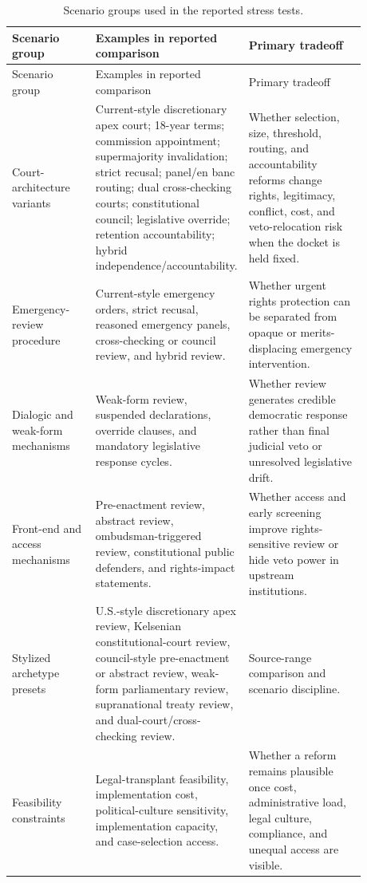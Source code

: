 \documentclass[
  journal=small,
  manuscript=research-article,
  year=2026
]{cup-journal}
\begin{document}
\begin{longtable}{L{0.24\linewidth}L{0.30\linewidth}L{0.34\linewidth}}
\caption{Scenario groups used in the reported stress tests.}
\label{tab:design-space}\\
\toprule
Scenario group & Examples in reported comparison & Primary tradeoff \\
\midrule
\endfirsthead
\toprule
Scenario group & Examples in reported comparison & Primary tradeoff \\
\midrule
\endhead
Court-architecture variants & Current-style discretionary apex court; 18-year terms; commission appointment; supermajority invalidation; strict recusal; panel/en banc routing; dual cross-checking courts; constitutional council; legislative override; retention accountability; hybrid independence/accountability. & Whether selection, size, threshold, routing, and accountability reforms change rights, legitimacy, conflict, cost, and veto-relocation risk when the docket is held fixed. \\
Emergency-review procedure & Current-style emergency orders, strict recusal, reasoned emergency panels, cross-checking or council review, and hybrid review. & Whether urgent rights protection can be separated from opaque or merits-displacing emergency intervention. \\
Dialogic and weak-form mechanisms & Weak-form review, suspended declarations, override clauses, and mandatory legislative response cycles. & Whether review generates credible democratic response rather than final judicial veto or unresolved legislative drift. \\
Front-end and access mechanisms & Pre-enactment review, abstract review, ombudsman-triggered review, constitutional public defenders, and rights-impact statements. & Whether access and early screening improve rights-sensitive review or hide veto power in upstream institutions. \\
Stylized archetype presets & U.S.-style discretionary apex review, Kelsenian constitutional-court review, council-style pre-enactment or abstract review, weak-form parliamentary review, supranational treaty review, and dual-court/cross-checking review. & Source-range comparison and scenario discipline. \\
Feasibility constraints & Legal-transplant feasibility, implementation cost, political-culture sensitivity, implementation capacity, and case-selection access. & Whether a reform remains plausible once cost, administrative load, legal culture, compliance, and unequal access are visible. \\
\bottomrule
\end{longtable}
\end{document}
